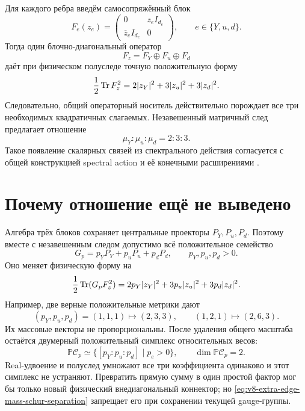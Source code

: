 Для каждого ребра введём самосопряжённый блок
\begin{equation}
 F_e(z_e)=
 \begin{pmatrix}
 0&z_e I_{d_e}\\
 \overline z_e I_{d_e}&0
 \end{pmatrix},
 \qquad e\in\{Y,u,d\}.
 \label{eq:v8-extra-edge-mass-block}
\end{equation}
Тогда один блочно-диагональный оператор
\begin{equation}
 F_z=F_Y\oplus F_u\oplus F_d
 \label{eq:v8-extra-edge-mass-common-operator}
\end{equation}
даёт при физическом полуследе точную положительную форму
\begin{equation}
 \frac12\operatorname{Tr} F_z^2
 =2|z_Y|^2+3|z_u|^2+3|z_d|^2.
 \label{eq:v8-extra-edge-mass-unweighted-half-trace}
\end{equation}
Следовательно, общий операторный носитель действительно порождает все три
необходимых квадратичных слагаемых. Незавешенный матричный след предлагает
отношение
\begin{equation}
 \mu_Y:\mu_u:\mu_d=2:3:3.
 \label{eq:v8-extra-edge-mass-unweighted-ratio}
\end{equation}
Такое появление скалярных связей из спектрального действия согласуется с
общей конструкцией spectral action и её конечными расширениями
\cite{v8-extra-edge-mass-spectral-action,v8-extra-edge-mass-stephan}.

\section{Почему отношение ещё не выведено}

Алгебра трёх блоков сохраняет центральные проекторы $P_Y,P_u,P_d$.
Поэтому вместе с незавешенным следом допустимо всё положительное семейство
\begin{equation}
 G_p=p_YP_Y+p_uP_u+p_dP_d,
 \qquad p_Y,p_u,p_d>0.
 \label{eq:v8-extra-edge-mass-central-metric}
\end{equation}
Оно меняет физическую форму на
\begin{equation}
 \frac12\operatorname{Tr}(G_pF_z^2)
 =2p_Y|z_Y|^2+3p_u|z_u|^2+3p_d|z_d|^2.
 \label{eq:v8-extra-edge-mass-central-family}
\end{equation}
Например, две верные положительные метрики дают
\begin{equation}
 (p_Y,p_u,p_d)=(1,1,1)\mapsto(2,3,3),\qquad
 (1,2,1)\mapsto(2,6,3).
 \label{eq:v8-extra-edge-mass-two-traces}
\end{equation}
Их массовые векторы не пропорциональны. После удаления общего масштаба
остаётся двумерный положительный симплекс относительных весов:
\begin{equation}
 \mathbb P\mathcal C_p\simeq
 \{[p_Y:p_u:p_d]\mid p_e>0\},\qquad
 \dim\mathbb P\mathcal C_p=2.
 \label{eq:v8-extra-edge-mass-projective-simplex}
\end{equation}
Real-удвоение и полуслед умножают все три коэффициента одинаково и этот
симплекс не устраняют. Превратить прямую сумму в один простой фактор мог бы
только новый физический внедиагональный коннектор; но
\eqref{eq:v8-extra-edge-mass-schur-separation} запрещает его при сохранении
текущей gauge-группы.


